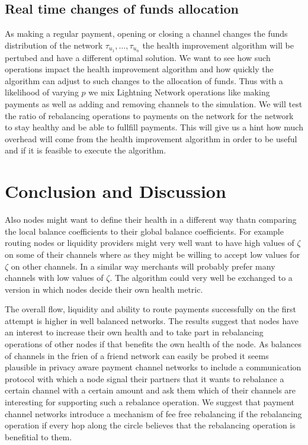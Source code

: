 \documentclass[a4paper]{paper}
\begin{document}
\subsection{Real time changes of funds allocation}
As making a regular payment, opening or closing a channel changes the funds distribution of the network $\tau_{u_1},\dots,\tau_{u_n}$ the health improvement algorithm will be pertubed and have a different optimal solution.
We want to see how such operations impact the health improvement algorithm and how quickly the algorithm can adjust to such changes to the allocation of funds.
Thus with a likelihood of varying $p$ we mix Lightning Network operations like making payments as well as adding and removing channels to the simulation.
We will test the ratio of rebalancing operations to payments on the network for the network to stay healthy and be able to fullfill payments.
This will give us a hint how much overhead will come from the health improvement algorithm in order to be useful and if it is feasible to execute the algorithm.


\section{Conclusion and Discussion}

Also nodes might want to define their health in a different way thatn comparing the local balance coefficients to their global balance coefficients.
For example routing nodes or liquidity providers might very well want to have high values of $\zeta$ on some of their channels where as they might be willing to accept low values for $\zeta$ on other channels.
In a similar way merchants will probably prefer many channels with low values of $\zeta$.
The algorithm could very well be exchanged to a version in which nodes decide their own health metric.


The overall flow, liquidity and ability to route payments successfully on the first attempt is higher in well balanced networks. 
The results suggest that nodes have an interest to increase their own health and to take part in rebalancing operations of other nodes if that benefits the own health of the node.
As balances of channels in the frien of a friend network can easily be probed it seems plausible in privacy aware payment channel networks to include a communication protocol with which a node signal their partners that it wants to rebalance a certain channel with a certain amount and ask them which of their channels are interesting for supporting such a rebalance operation.
We suggest that payment channel networks introduce a mechanism of fee free rebalancing if the rebalancing operation if every hop along the circle believes that the rebalancing operation is benefitial to them. 




\end{document}
